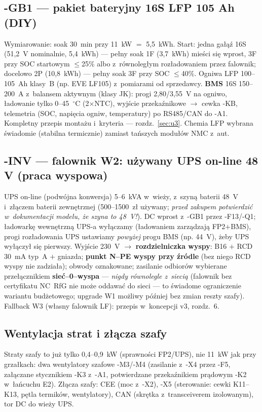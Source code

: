 \documentclass[11pt,a4paper]{article}
\begin{document}
\subsection{-GB1 --- pakiet bateryjny 16S LFP 105 Ah (DIY)}
Wymiarowanie: soak 30~min przy 11~kW $=$ 5,5~kWh. Start: jedna gałąź 16S (51,2~V nominalnie, 5,4~kWh) ---
pełny soak 1F (3,7~kWh) mieści się wprost, 3F przy SOC startowym $\le$25\% albo z~równoległym rozładowaniem
przez falownik; docelowo 2P (10,8~kWh) --- pełny soak 3F przy SOC $\le$40\%. Ogniwa LFP 100--105~Ah klasy~B
(np. EVE LF105) z~pomiarami od sprzedawcy. \textbf{BMS} 16S 150--200~A z~balansem aktywnym (klasy JK):
progi 2,80/3,55~V na ogniwo, ładowanie tylko 0--45~$^{\circ}$C (2$\times$NTC), wyjście przekaźnikowe $\to$
cewka -KB, telemetria (SOC, napięcia ogniw, temperatury) po RS485/CAN do -A1. Kompletny przepis montażu
i~kryteria --- rozdz.~\ref{sec:u3}. Chemia LFP wybrana świadomie (stabilna termicznie) zamiast tańszych
modułów NMC z~aut.

\subsection{-INV --- falownik W2: używany UPS on-line 48 V (praca wyspowa)}
UPS on-line (podwójna konwersja) 5--6~kVA w~wieży, z~szyną baterii 48~V i~złączem baterii zewnętrznej
(500--1500~zł używany; \emph{przed zakupem potwierdzić w~dokumentacji modelu, że szyna to 48~V!}). DC wprost
z~-GB1 przez -F13/-Q1; ładowarkę wewnętrzną UPS-a wyłączamy (ładowaniem zarządzają FP2$+$BMS), progi
rozładowania UPS ustawiamy \emph{powyżej} progu BMS (np. 44~V), żeby UPS wyłączył się pierwszy. Wyjście 230~V
$\to$ \textbf{rozdzielniczka wyspy}: B16 $+$ RCD 30~mA typ~A $+$ gniazda; \textbf{punkt N--PE wyspy przy
źródle} (bez niego RCD wyspy nie zadziała); obwody oznakowane; zasilanie odbiorów wybierane przełącznikiem
\textbf{sieć--0--wyspa} --- \emph{nigdy równolegle z~siecią} (falownik bez certyfikatu NC~RfG nie może oddawać
do sieci --- to świadome ograniczenie wariantu budżetowego; upgrade W1 możliwy później bez zmian reszty szafy).
Fallback W3 (własny falownik LF): przepis w~koncepcji v3, rozdz.~6.

\subsection{Wentylacja strat i złącza szafy}
Straty szafy to już tylko 0,4--0,9~kW (sprawności FP2/UPS), nie 11~kW jak przy grzałkach: dwa wentylatory
szafowe -M3/-M4 (zasilanie z~-X4 przez -F5, załączane stycznikiem -K3 z~-A1, potwierdzane przekaźnikiem
prądowym -K2 w~łańcuchu E2). Złącza szafy: CEE (moc z~-X2), -X5 (sterowanie: cewki K11--K13, pętla termików,
wentylatory), CAN (skrętka z~transceiverem izolowanym), tor DC do wieży UPS.
\end{document}
